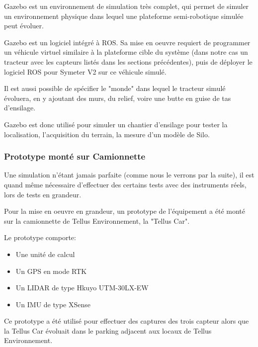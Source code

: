 \documentclass[12pt,a4paper]{report}
\begin{document}
			Gazebo est un environnement de simulation très complet, qui permet de simuler un environnement physique dans lequel une plateforme semi-robotique simulée peut évoluer. 
		
			
			\para Gazebo est un logiciel intégré à ROS. Sa mise en oeuvre requiert de programmer un véhicule virtuel similaire à la plateforme cible du système (dans notre cas un tracteur avec les capteurs listés dans les sections précédentes), puis de déployer le logiciel ROS pour Symeter V2 sur ce véhicule simulé. 
			
			\para Il est aussi possible de spécifier le "monde" dans lequel le tracteur simulé évoluera, en y ajoutant des murs, du relief, voire une butte en guise de tas d'ensilage.
		
			
			\para Gazebo est donc utilisé pour simuler un chantier d'ensilage pour tester la localisation, l'acquisition du terrain, la mesure d'un modèle de Silo.
			
			\subsubsection{Prototype monté sur Camionnette}
			
			Une simulation n'étant jamais parfaite (comme nous le verrons par la suite), il est quand même nécessaire d'effectuer des certains tests avec des instruments réels, lors de tests en grandeur.
		
	
				
			\para Pour la mise en oeuvre en grandeur, un prototype de l'équipement a été monté sur la camionnette de Tellus Environnement, la "Tellus Car".
			
			\para Le prototype comporte:
			\begin{itemize}
				\item Une unité de calcul
				\item Un GPS en mode RTK
				\item Un LIDAR de type Hkuyo UTM-30LX-EW
				\item Un IMU de type XSense
			\end{itemize}
		
			\para Ce prototype a été utilisé pour effectuer des captures des trois capteur alors que la Tellus Car évoluait dans le parking adjacent aux locaux de Tellus Environnement.
		
\end{document}
